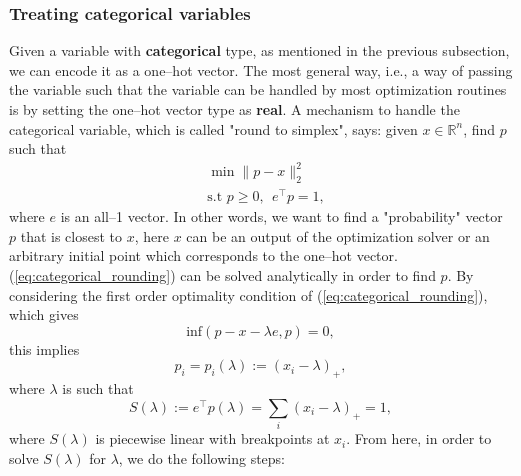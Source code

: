 \documentclass[12pt]{article}
\begin{document}
\subsubsection{Treating categorical variables}
\label{sec:hyperopt_cat}
Given a variable with \textbf{categorical} type, as mentioned in the previous subsection, we can encode it as a one--hot vector. The most general way, i.e., a way of passing the variable such that the variable can be handled by most optimization routines is by setting the one--hot vector type as \textbf{real}. A mechanism to handle the categorical variable, which is called "round to simplex", says: given $x \in \mathbb{R}^n$, find $p$ such that 
\begin{equation}
	\begin{split}
		&\min \|p-x\|^2_2 \\	
		&\text{s.t } p \geq 0, ~~ e^\top p = 1,
	\end{split}
	\label{eq:categorical_rounding}
\end{equation}
where $e$ is an all--1 vector. In other words, we want to find a "probability" vector $p$ that is closest to $x$, here $x$ can be an output of the optimization solver or an arbitrary initial point which corresponds to the one--hot vector. (\ref{eq:categorical_rounding}) can be solved analytically in order to find $p$. By considering the first order optimality condition of (\ref{eq:categorical_rounding}), which gives
\begin{equation*}
	\text{inf}(p-x-\lambda e, p) = 0,
\end{equation*}
this implies
\begin{equation*}
	p_i = p_i(\lambda) := (x_i - \lambda)_+,
\end{equation*}
where $\lambda$ is such that
\begin{equation*}
	S(\lambda) := e^\top p(\lambda) = \sum_i (x_i - \lambda)_+ = 1,
\end{equation*}
where $S(\lambda)$ is piecewise linear with breakpoints at $x_i$. From here, in order to solve $S(\lambda)$ for $\lambda$, we do the following steps:
\end{document}
